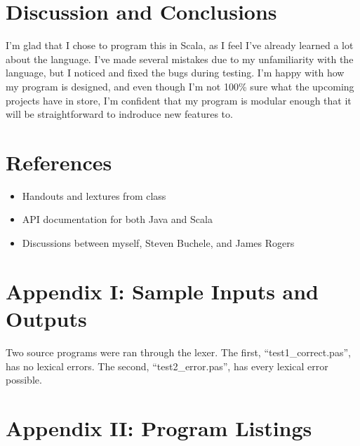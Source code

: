 \documentclass[paper=letter, fontsize=11pt, oneside, titlepage]{scrartcl}
\newcommand{\datalisting}[2][]{
    
}
\newcommand{\filelisting}[2][]{
    
}
\begin{document}
\section{Discussion and Conclusions}\label{conclusions}

I'm glad that I chose to program this in Scala, as I feel I've already learned a lot about the language.  I've made several mistakes due to my unfamiliarity with the language, but I noticed and fixed the bugs during testing.  I'm happy with how my program is designed, and even though I'm not 100\% sure what the upcoming projects have in store, I'm confident that my program is modular enough that it will be straightforward to indroduce new features to.

\section{References}\label{ref}

\begin{itemize}
    \item Handouts and lextures from class
    \item API documentation for both Java and Scala
    \item Discussions between myself, Steven Buchele, and James Rogers
\end{itemize}

\section{Appendix I: Sample Inputs and Outputs}\label{sample}

Two source programs were ran through the lexer. The first, ``test1\_correct.pas'', has no lexical errors.  The second, ``test2\_error.pas'', has every lexical error possible.

\filelisting[language=pascal]{test1_correct.pas}
\filelisting{test1_correct.pas.listing}
\filelisting{test1_correct.pas.tokens}
\filelisting[language=pascal]{test2_errors.pas}
\filelisting{test2_errors.pas.listing}
\filelisting{test2_errors.pas.tokens}

\section{Appendix II: Program Listings}\label{code}

\datalisting{operators.dat}
\datalisting{punctuation.dat}
\datalisting{reservedwords.dat}
\end{document}
